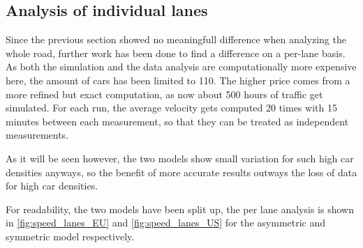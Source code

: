 \subsection{Analysis of individual lanes}
\label{sec:results:indiv}
Since the previous section showed no meaningfull difference when analyzing the whole road, further
work has been done to find a difference on a per-lane basis. As both the simulation and the data
analysis are computationally more expensive here, the amount of cars has been limited to 110. The
higher price comes from a more refined but exact computation, as now about 500 hours of traffic get
simulated. For each run, the average velocity gets computed 20 times with 15 minutes between each
measurement, so that they can be treated as independent measurements.

As it will be seen however, the two models show small variation for such high car densities anyways,
so the benefit of more accurate results outways the loss of data for high car densities.

For readability, the two models have been split up, the per lane analysis is shown in 
\autoref{fig:speed_lanes_EU} and 
\autoref{fig:speed_lanes_US} for the asymmetric and symmetric model respectively.

